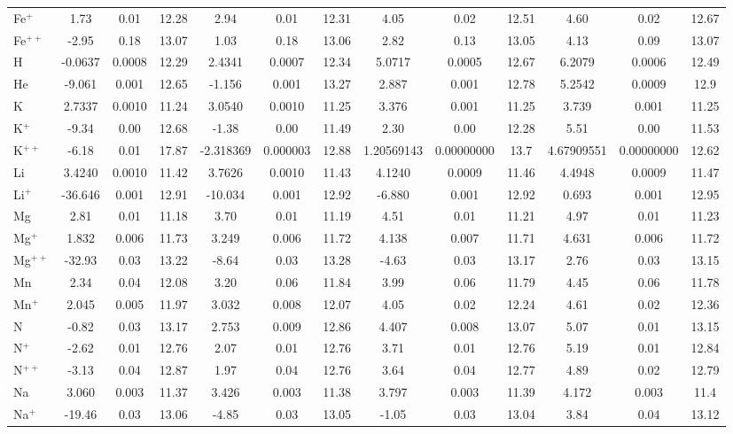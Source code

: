 \begin{longtable}{l!{\vrule width 0.25pt}ccc!{\vrule width 0.25pt}ccc!{\vrule width 0.25pt}ccc!{\vrule width 0.25pt}ccc}
Fe$^+$ & 1.73 & 0.01 & 12.28 & 2.94 & 0.01 & 12.31 & 4.05 & 0.02 & 12.51 & 4.60 & 0.02 & 12.67 \\
Fe$^{++}$ & -2.95 & 0.18 & 13.07 & 1.03 & 0.18 & 13.06 & 2.82 & 0.13 & 13.05 & 4.13 & 0.09 & 13.07 \\
H & -0.0637 & 0.0008 & 12.29 & 2.4341 & 0.0007 & 12.34 & 5.0717 & 0.0005 & 12.67 & 6.2079 & 0.0006 & 12.49 \\
He & -9.061 & 0.001 & 12.65 & -1.156 & 0.001 & 13.27 & 2.887 & 0.001 & 12.78 & 5.2542 & 0.0009 & 12.9 \\
K & 2.7337 & 0.0010 & 11.24 & 3.0540 & 0.0010 & 11.25 & 3.376 & 0.001 & 11.25 & 3.739 & 0.001 & 11.25 \\
K$^+$ & -9.34 & 0.00 & 12.68 & -1.38 & 0.00 & 11.49 & 2.30 & 0.00 & 12.28 & 5.51 & 0.00 & 11.53 \\
K$^{++}$ & -6.18 & 0.01 & 17.87 & -2.318369 & 0.000003 & 12.88 & 1.20569143 & 0.00000000 & 13.7 & 4.67909551 & 0.00000000 & 12.62 \\
Li & 3.4240 & 0.0010 & 11.42 & 3.7626 & 0.0010 & 11.43 & 4.1240 & 0.0009 & 11.46 & 4.4948 & 0.0009 & 11.47 \\
Li$^+$ & -36.646 & 0.001 & 12.91 & -10.034 & 0.001 & 12.92 & -6.880 & 0.001 & 12.92 & 0.693 & 0.001 & 12.95 \\
Mg & 2.81 & 0.01 & 11.18 & 3.70 & 0.01 & 11.19 & 4.51 & 0.01 & 11.21 & 4.97 & 0.01 & 11.23 \\
Mg$^+$ & 1.832 & 0.006 & 11.73 & 3.249 & 0.006 & 11.72 & 4.138 & 0.007 & 11.71 & 4.631 & 0.006 & 11.72 \\
Mg$^{++}$ & -32.93 & 0.03 & 13.22 & -8.64 & 0.03 & 13.28 & -4.63 & 0.03 & 13.17 & 2.76 & 0.03 & 13.15 \\
Mn & 2.34 & 0.04 & 12.08 & 3.20 & 0.06 & 11.84 & 3.99 & 0.06 & 11.79 & 4.45 & 0.06 & 11.78 \\
Mn$^+$ & 2.045 & 0.005 & 11.97 & 3.032 & 0.008 & 12.07 & 4.05 & 0.02 & 12.24 & 4.61 & 0.02 & 12.36 \\
N & -0.82 & 0.03 & 13.17 & 2.753 & 0.009 & 12.86 & 4.407 & 0.008 & 13.07 & 5.07 & 0.01 & 13.15 \\
N$^+$ & -2.62 & 0.01 & 12.76 & 2.07 & 0.01 & 12.76 & 3.71 & 0.01 & 12.76 & 5.19 & 0.01 & 12.84 \\
N$^{++}$ & -3.13 & 0.04 & 12.87 & 1.97 & 0.04 & 12.76 & 3.64 & 0.04 & 12.77 & 4.89 & 0.02 & 12.79 \\
Na & 3.060 & 0.003 & 11.37 & 3.426 & 0.003 & 11.38 & 3.797 & 0.003 & 11.39 & 4.172 & 0.003 & 11.4 \\
Na$^+$ & -19.46 & 0.03 & 13.06 & -4.85 & 0.03 & 13.05 & -1.05 & 0.03 & 13.04 & 3.84 & 0.04 & 13.12 \\

\end{longtable}

